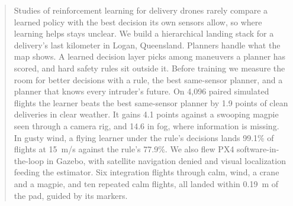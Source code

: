 \begin{abstract}
Studies of reinforcement learning for delivery drones rarely compare a learned policy with the best decision its own sensors allow, so where learning helps stays unclear. We build a hierarchical landing stack for a delivery's last kilometer in Logan, Queensland. Planners handle what the map shows. A learned decision layer picks among maneuvers a planner has scored, and hard safety rules sit outside it. Before training we measure the room for better decisions with a rule, the best same-sensor planner, and a planner that knows every intruder's future. On 4,096 paired simulated flights the learner beats the best same-sensor planner by 1.9 points of clean deliveries in clear weather. It gains 4.1 points against a swooping magpie seen through a camera rig, and 14.6 in fog, where information is missing. In gusty wind, a flying learner under the rule's decisions lands 99.1\% of flights at 15~m/s against the rule's 77.9\%. We also flew PX4 software-in-the-loop in Gazebo, with satellite navigation denied and visual localization feeding the estimator. Six integration flights through calm, wind, a crane and a magpie, and ten repeated calm flights, all landed within 0.19~m of the pad, guided by its markers.
\end{abstract}
